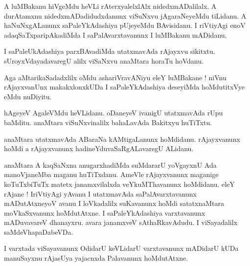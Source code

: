 \documentclass{article}
\begin{document}
\begin{mn}%
A luMBakanu hiVgeMdu heVLi rAterxyalelxlAlx nidedxmADalilalx. A durAtamxnu nidedxmADadidudxdanunx 
viSuNxvu jAgaraNeyeMdu tiLidanu. A haNuNxgALanunx saPaleYkAdashiya pUjeyeMdu BAvisidanu. I 
riVtiyAgi enoV adaqSaTxparipAkadiMda I saPalAvarxtavanunx I luMBakanu mADidanu.
\end{mn}

\begin{mn}%
I saPaleUkAdashiya parxBAvadiMda utatxmavAda rAjayxvu sikitxtu. sUroyxVdayadavaregU alilx viSaNxvu 
anaMtara horaTu hoVdanu.
\end{mn}

\begin{mn}%
Aga aMtarikaSadadxlilx oMdu ashariVravANiyu eleY luMBakane ! niVnu rAjayxvanUnx makakxlonxkUDa I 
saPaleYkAdashiya deseyiMda hoMdutitxVye eMdu nuDiyitu.
\end{mn}

\begin{mn}%
hAgeyeV AgaleVMdu heVLidanu. oDaneyeV ivanigU utatxmavAda rUpu baMditu. anaMtara viSuNxvinalilx 
bahaLavAda Bakitxyu huTiTxtu.
\end{mn}

\begin{mn}%
anaMtara utatxmavAda ABaraNa kAMtigaLanunx hoMdidanu. rAjayxvanunx hoMdi a rAjayxvanunx 
hadineYduvaSaRgALavaregU ALidanu.
\end{mn}

\begin{mn}%
anaMtara A kaqSaNxna anugarxhadiMda suMdararU yoVgayxnU Ada manoVjaneMba maganu huTiTxdanu. AmeVle 
rAjayxvanunx maganige koTuTxbiTuTx matetx janamxvilalxda veYkuMThavanunx hoMdidanu. eleY rAjane ! 
IriVtiyAgi yAvanu I utatxmavAda saPalAvarxtavanunx mADutAtxneyoV avanu I loVkadalilx suKavanunx 
hoMdi satatxnaMtara moVkaSxvanunx hoMdutAtxne. I saPaleYkAdashiya varxtavanunx mADuvavareV 
dhanayxru. avara janamxveV sAthaRkavAdudu. I viSayadalilx saMdeVhapaDabeVDa.
\end{mn}

\begin{mn}%
I varxtada viSayavanunx OdidarU keVLidarU varxtavanunx mADidarU kUDa manuSayxnu rAjasUya yajacnxda 
Palavanunx hoMdutAtxne.
\end{mn}

\end{document}
